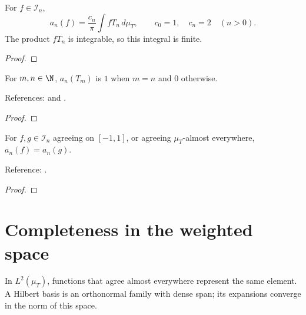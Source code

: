 \begin{supporting}

\begin{theorem}
\label{thm:coefficient-characterisation}
\leanok
For $f\in\mathcal I_n$,
\[a_n(f)=\frac{c_n}{\pi}\int fT_n\,d\mu_T,
\qquad c_0=1,\quad c_n=2\quad(n>0).\]
The product $fT_n$ is integrable, so this integral is finite.
\end{theorem}
\begin{proof}
\leanok
\end{proof}

\begin{theorem}
\label{thm:coefficient-T}
\leanok

For $m,n\in\N$, $a_n(T_m)$ is $1$ when $m=n$ and $0$ otherwise.

References: \cite[Table 18.3.1]{dlmf} and \cite[Chapter 3]{atap}.
\end{theorem}
\begin{proof}
\leanok
\end{proof}

\begin{theorem}
\label{thm:coefficient-congr}
\leanok
{}
For $f,g\in\mathcal I_n$ agreeing on $[-1,1]$, or agreeing $\mu_T$-almost
everywhere, $a_n(f)=a_n(g)$.

Reference: \cite[Chapter 3]{atap}.
\end{theorem}
\begin{proof}
\leanok
\end{proof}

\end{supporting}

\section{Completeness in the weighted space}\label{sec:textbook-coefficients-completeness}

In $L^2(\mu_T)$, functions that agree almost everywhere represent the same element. A Hilbert basis is an orthonormal family with dense span; its expansions converge in the norm of this space.

